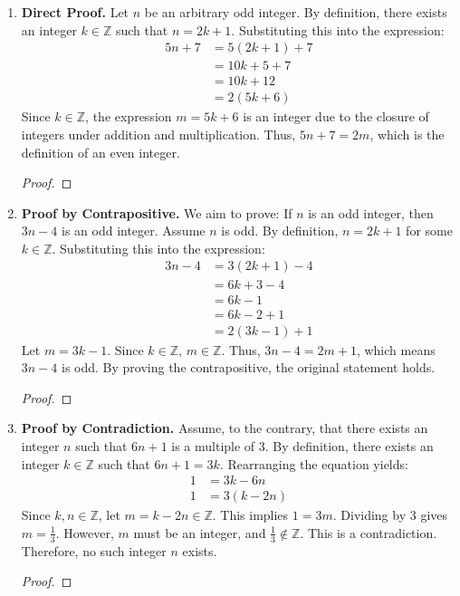 \documentclass[11pt]{article}
\renewcommand{\qedsymbol}{$\blacksquare$}
\begin{document}
\begin{enumerate}
    \item \textbf{Direct Proof.} Let $n$ be an arbitrary odd integer. By definition, there exists an integer $k \in \mathbb{Z}$ such that $n = 2k + 1$. Substituting this into the expression:
    \begin{align*}
        5n + 7 &= 5(2k + 1) + 7 \\
               &= 10k + 5 + 7 \\
               &= 10k + 12 \\
               &= 2(5k + 6)
    \end{align*}
    Since $k \in \mathbb{Z}$, the expression $m = 5k + 6$ is an integer due to the closure of integers under addition and multiplication. Thus, $5n + 7 = 2m$, which is the definition of an even integer.
    \begin{proof}\renewcommand{\qedsymbol}{$\blacksquare$}\end{proof}

    \item \textbf{Proof by Contrapositive.} We aim to prove: If $n$ is an odd integer, then $3n - 4$ is an odd integer. Assume $n$ is odd. By definition, $n = 2k + 1$ for some $k \in \mathbb{Z}$. Substituting this into the expression:
    \begin{align*}
        3n - 4 &= 3(2k + 1) - 4 \\
               &= 6k + 3 - 4 \\
               &= 6k - 1 \\
               &= 6k - 2 + 1 \\
               &= 2(3k - 1) + 1
    \end{align*}
    Let $m = 3k - 1$. Since $k \in \mathbb{Z}$, $m \in \mathbb{Z}$. Thus, $3n - 4 = 2m + 1$, which means $3n - 4$ is odd. By proving the contrapositive, the original statement holds.
    \begin{proof}\renewcommand{\qedsymbol}{$\blacksquare$}\end{proof}

    \item \textbf{Proof by Contradiction.} Assume, to the contrary, that there exists an integer $n$ such that $6n + 1$ is a multiple of 3. By definition, there exists an integer $k \in \mathbb{Z}$ such that $6n + 1 = 3k$. Rearranging the equation yields:
    \begin{align*}
        1 &= 3k - 6n \\
        1 &= 3(k - 2n)
    \end{align*}
    Since $k, n \in \mathbb{Z}$, let $m = k - 2n \in \mathbb{Z}$. This implies $1 = 3m$. Dividing by 3 gives $m = \frac{1}{3}$. However, $m$ must be an integer, and $\frac{1}{3} \notin \mathbb{Z}$. This is a contradiction. Therefore, no such integer $n$ exists.
    \begin{proof}\renewcommand{\qedsymbol}{$\blacksquare$}\end{proof}


\end{enumerate}
\end{document}
